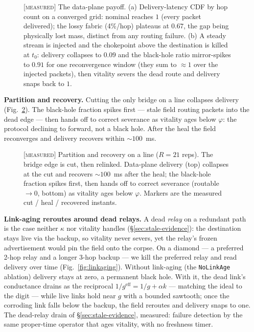 \documentclass[11pt]{article}
\theoremstyle{plain}
\numberwithin{equation}{section}
\begin{document}
\begin{figure}[tbp]
\centering

\caption{\textsc{[measured]} The data-plane payoff. (a) Delivery-latency CDF by hop count on a converged grid: nominal reaches $1$ (every packet delivered); the lossy fabric (4\%/hop) plateaus at $0.67$, the gap being physically lost mass, distinct from any routing failure. (b) A steady stream is injected and the chokepoint above the destination is killed at $t_0$: delivery collapses to $0.09$ and the black-hole ratio mirror-spikes to $0.91$ for one reconvergence window (they sum to $\approx\!1$ over the injected packets), then vitality severs the dead route and delivery snaps back to $1$.}
\label{fig:blackhole}
\end{figure}

\textbf{Partition and recovery.} Cutting the only bridge on a line collapses delivery (Fig.~\ref{fig:partition}). The black-hole fraction spikes first — stale field routing packets into the dead edge — then hands off to correct severance as vitality ages below $\varphi$: the protocol declining to forward, not a black hole. After the heal the field reconverges and delivery recovers within $\sim\!100$~ms.

\begin{figure}[tbp]
\centering

\caption{\textsc{[measured]} Partition and recovery on a line ($R=21$ reps). The bridge edge is cut, then relinked. Data-plane delivery (top) collapses at the cut and recovers $\sim\!100$~ms after the heal; the black-hole fraction spikes first, then hands off to correct severance (routable$\to 0$, bottom) as vitality ages below $\varphi$. Markers are the measured cut / heal / recovered instants.}
\label{fig:partition}
\end{figure}

\textbf{Link-aging reroutes around dead relays.} A dead \emph{relay} on a redundant path is the case neither $\kappa$ nor vitality handles (§\ref{sec:stale-evidence}): the destination stays live via the backup, so vitality never severs, yet the relay's frozen advertisement would pin the field onto the corpse. On a diamond — a preferred 2-hop relay and a longer 3-hop backup — we kill the preferred relay and read delivery over time (Fig.~\ref{fig:linkaging}). Without link-aging (the \texttt{NoLinkAge} ablation) delivery stays at zero, a permanent black hole. With it, the dead link's conductance drains as the reciprocal $1/g^{\mathrm{eff}}=1/g+\alpha k$ — matching the ideal to the digit — while live links hold near $g$ with a bounded sawtooth; once the corroding link falls below the backup, the field reroutes and delivery snaps to one. The dead-relay drain of §\ref{sec:stale-evidence}, measured: failure detection by the same proper-time operator that ages vitality, with no freshness timer.
\end{document}
